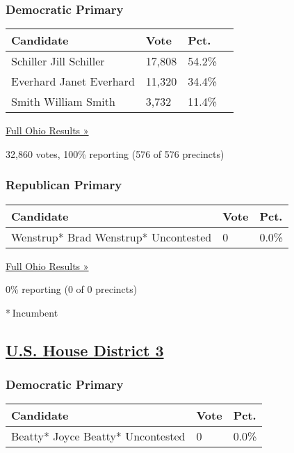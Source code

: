 \hypertarget{democratic-primary-3}{%
\subsubsection{Democratic Primary}\label{democratic-primary-3}}

\begin{longtable}[]{@{}llll@{}}
\toprule
Candidate & Vote & Pct. &\tabularnewline
\midrule
\endhead
 Schiller Jill Schiller & 17,808 & 54.2\% &\tabularnewline
 Everhard Janet Everhard & 11,320 & 34.4\% &\tabularnewline
 Smith William Smith & 3,732 & 11.4\% &\tabularnewline
\bottomrule
\end{longtable}

\href{https://www.nytimes3xbfgragh.onion/elections/results/ohio}{Full
Ohio Results »}

32,860 votes, 100\% reporting (576 of 576 precincts)

\hypertarget{republican-primary-3}{%
\subsubsection{Republican Primary}\label{republican-primary-3}}

\begin{longtable}[]{@{}lll@{}}
\toprule
Candidate & Vote & Pct.\tabularnewline
\midrule
\endhead
 Wenstrup* Brad Wenstrup* Uncontested & 0 & 0.0\%\tabularnewline
\bottomrule
\end{longtable}

\href{https://www.nytimes3xbfgragh.onion/elections/results/ohio}{Full
Ohio Results »}

0\% reporting (0 of 0 precincts)

* Incumbent

\hypertarget{us-house-district-3}{%
\subsection{\texorpdfstring{\href{https://www.nytimes3xbfgragh.onion/elections/results/ohio-house-district-3-primary-election}{U.S.
House District 3}}{U.S. House District 3}}\label{us-house-district-3}}

\hypertarget{democratic-primary-4}{%
\subsubsection{Democratic Primary}\label{democratic-primary-4}}

\begin{longtable}[]{@{}lll@{}}
\toprule
Candidate & Vote & Pct.\tabularnewline
\midrule
\endhead
 Beatty* Joyce Beatty* Uncontested & 0 & 0.0\%\tabularnewline
\bottomrule
\end{longtable}

